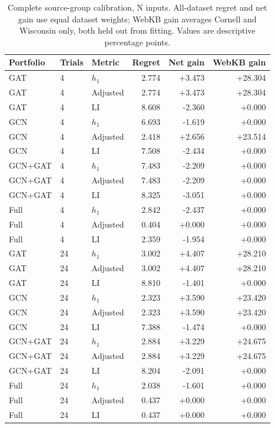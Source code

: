 \begin{table}[tbp]
\centering
\caption{Complete source-group calibration, N inputs. All-dataset regret and net gain use equal dataset weights; WebKB gain averages Cornell and Wisconsin only, both held out from fitting. Values are descriptive percentage points.}
\label{tab:group_all_N}
\small
\setlength{\tabcolsep}{3pt}
\begin{tabular}{@{}lllrrr@{}}
\toprule
Portfolio & Trials & Metric & Regret & Net gain & WebKB gain \\
\midrule
GAT & 4 & $h_1$ & 2.774 & +3.473 & +28.304 \\
GAT & 4 & Adjusted & 2.774 & +3.473 & +28.304 \\
GAT & 4 & LI & 8.608 & -2.360 & +0.000 \\
GCN & 4 & $h_1$ & 6.693 & -1.619 & +0.000 \\
GCN & 4 & Adjusted & 2.418 & +2.656 & +23.514 \\
GCN & 4 & LI & 7.508 & -2.434 & +0.000 \\
GCN+GAT & 4 & $h_1$ & 7.483 & -2.209 & +0.000 \\
GCN+GAT & 4 & Adjusted & 7.483 & -2.209 & +0.000 \\
GCN+GAT & 4 & LI & 8.325 & -3.051 & +0.000 \\
Full & 4 & $h_1$ & 2.842 & -2.437 & +0.000 \\
Full & 4 & Adjusted & 0.404 & +0.000 & +0.000 \\
Full & 4 & LI & 2.359 & -1.954 & +0.000 \\
GAT & 24 & $h_1$ & 3.002 & +4.407 & +28.210 \\
GAT & 24 & Adjusted & 3.002 & +4.407 & +28.210 \\
GAT & 24 & LI & 8.810 & -1.401 & +0.000 \\
GCN & 24 & $h_1$ & 2.323 & +3.590 & +23.420 \\
GCN & 24 & Adjusted & 2.323 & +3.590 & +23.420 \\
GCN & 24 & LI & 7.388 & -1.474 & +0.000 \\
GCN+GAT & 24 & $h_1$ & 2.884 & +3.229 & +24.675 \\
GCN+GAT & 24 & Adjusted & 2.884 & +3.229 & +24.675 \\
GCN+GAT & 24 & LI & 8.204 & -2.091 & +0.000 \\
Full & 24 & $h_1$ & 2.038 & -1.601 & +0.000 \\
Full & 24 & Adjusted & 0.437 & +0.000 & +0.000 \\
Full & 24 & LI & 0.437 & +0.000 & +0.000 \\
\bottomrule
\end{tabular}
\end{table}

